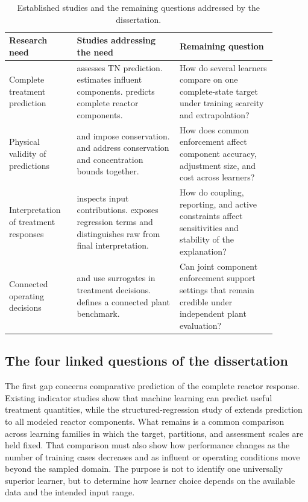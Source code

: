\begin{table}[htbp]
\centering\footnotesize
\caption{Established studies and the remaining questions addressed by the dissertation.}
\label{tab:rrl_evidence_gap_matrix}
\begin{tabular}{>{\raggedright\arraybackslash}p{0.22\linewidth}>{\raggedright\arraybackslash}p{0.34\linewidth}>{\raggedright\arraybackslash}p{0.32\linewidth}}
\toprule Research need & Studies addressing the need & Remaining question\\\midrule
Complete treatment prediction & \citet{Wang2025} assesses TN prediction. \citet{Wang2024} estimates influent components. \citet{Selerio2026} predicts complete reactor components. & How do several learners compare on one complete-state target under training scarcity and extrapolation?\\
Physical validity of predictions & \citet{Beucler2021} and \citet{SturmWexler2022} impose conservation. \citet{KircherVotsmeier2025} and \citet{Selerio2026} address conservation and concentration bounds together. & How does common enforcement affect component accuracy, adjustment size, and cost across learners?\\
Interpretation of treatment responses & \citet{Wang2025} inspects input contributions. \citet{Selerio2026} exposes regression terms and distinguishes raw from final interpretation. & How do coupling, reporting, and active constraints affect sensitivities and stability of the explanation?\\
Connected operating decisions & \citet{Fang2011} and \citet{Durkin2024} use surrogates in treatment decisions. \citet{Alex2008} defines a connected plant benchmark. & Can joint component enforcement support settings that remain credible under independent plant evaluation?\\
\bottomrule
\end{tabular}
\end{table}

\subsection{The four linked questions of the dissertation}

The first gap concerns comparative prediction of the complete reactor response. Existing indicator studies show that machine learning can predict useful treatment quantities, while the structured-regression study of \citet{Selerio2026} extends prediction to all modeled reactor components. What remains is a common comparison across learning families in which the target, partitions, and assessment scales are held fixed. That comparison must also show how performance changes as the number of training cases decreases and as influent or operating conditions move beyond the sampled domain. The purpose is not to identify one universally superior learner, but to determine how learner choice depends on the available data and the intended input range.

